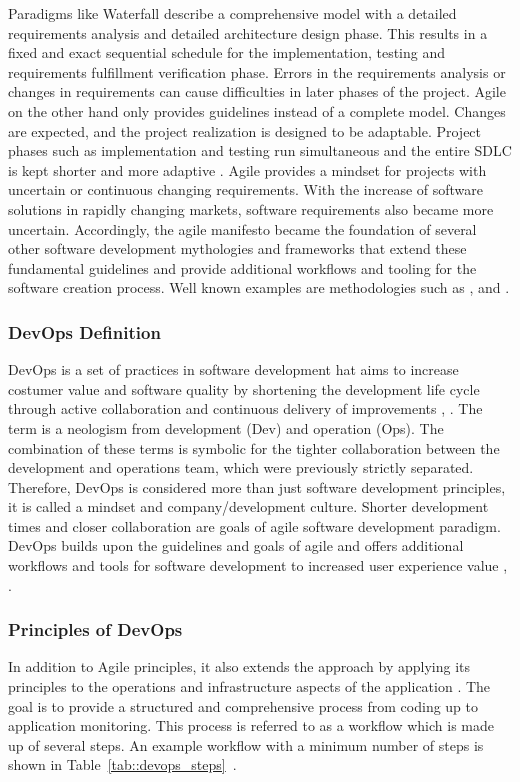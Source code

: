 \documentclass[12pt, a4paper]{article}
\begin{document}
        \noindent Paradigms like Waterfall describe a comprehensive model with a detailed requirements analysis and detailed architecture design phase. This results in a fixed and exact sequential schedule for the implementation, testing and requirements fulfillment verification phase. Errors in the requirements analysis or changes in requirements can cause difficulties in later phases of the project. Agile on the other hand only provides guidelines instead of a complete model. Changes are expected, and the project realization is designed to be adaptable. Project phases such as implementation and testing run simultaneous and the entire \ac{SDLC} is kept shorter and more adaptive \cite{agile_practice}.\newline
        Agile provides a mindset for projects with uncertain or continuous changing requirements. With the increase of software solutions in rapidly changing markets, software requirements also became more uncertain. Accordingly, the agile manifesto became the foundation of several other software development mythologies and frameworks that extend these fundamental guidelines and provide additional workflows and tooling for the software creation process. Well known examples are methodologies such as ,  and .

        \subsubsection{DevOps Definition}
        DevOps is a set of practices in software development hat aims to increase costumer value and software quality by shortening the development life cycle through active collaboration and continuous delivery of improvements \cite{base_devops}, \cite{effective_devops}. The term  is a neologism from development (Dev) and operation (Ops). The combination of these terms is symbolic for the tighter collaboration between the development and operations team, which were previously strictly separated. Therefore, DevOps is considered more than just software development principles, it is called a mindset and company/development culture. Shorter development times and closer collaboration are goals of agile software development paradigm. DevOps builds upon the guidelines and goals of agile and offers additional workflows and tools for software development to increased user experience value \cite{azuredevops}, \cite{effective_devops}.

        \subsubsection{Principles of DevOps}\label{ssec::devops_princibles}
        In addition to Agile principles, it also extends the  approach by applying its principles to the operations and infrastructure aspects of the application \cite{effective_devops}. The goal is to provide a structured and comprehensive process from coding up to application monitoring. This process is referred to as a workflow which is made up of several steps. An example workflow with a minimum number of steps is shown in Table~\ref{tab::devops_steps}~\cite{base_devops}.
\end{document}
